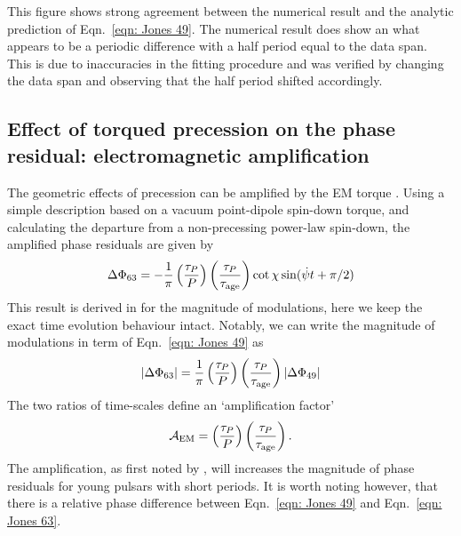 \documentclass[../full_thesis/full_thesis.tex]{subfiles}
\begin{document}
This figure shows strong agreement between the numerical result and the
analytic prediction of Eqn.~\eqref{eqn: Jones 49}. The numerical result does
show an what appears to be a periodic difference with a half period equal to
the data span. This is due to inaccuracies in the fitting procedure and was
verified by changing the data span and observing that the half period shifted
accordingly.


\subsection{Effect of torqued precession on the phase residual: electromagnetic amplification}
\label{sec: phase residual torqued}

The geometric effects of precession can be amplified by the EM torque \citep{Cordes1993}.
Using a simple description based on a vacuum point-dipole spin-down torque,
and calculating the departure from a non-precessing power-law spin-down,
the amplified phase residuals are given by
\begin{align}
\Delta\Phi_{63} = -\frac{1}{\pi}\left(\frac{\tau_{P}}{P}\right)
                               \left(\frac{\tau_{P}}{\tau_{\mathrm{age}}}\right)
                               \cot\chi
                               \sin(\dot{\psi} t + \pi/2)
\label{eqn: Jones 63}
\end{align}
This result is derived in \citet{Jones2001} for the magnitude of modulations, here
we keep the exact time evolution behaviour intact. Notably, we can write the
magnitude of modulations in term of Eqn.~\eqref{eqn: Jones 49} as
\begin{equation}
    |\Delta\Phi_{63}| = \frac{1}{\pi}\left(\frac{\tau_{P}}{P}\right)
    \left(\frac{\tau_{P}}{\tau_{\mathrm{age}}}\right)
                                    |\Delta\Phi_{49}|
\label{eqn: Jones 63 mag}
\end{equation}
The two ratios of time-scales define an `amplification factor'
\begin{equation}
    \mathcal{A}_{\mathrm{EM}} = \left(\frac{\tau_{P}}{P}\right)
                                \left(\frac{\tau_{P}}{\tau_{\mathrm{age}}}\right).
\label{eqn: EM amplification}
\end{equation}
The amplification, as first noted by \citet{Cordes1993}, will increases the
magnitude of phase residuals for young pulsars with short periods. It is worth
noting however, that there is a relative phase difference between
Eqn.~\eqref{eqn: Jones 49} and Eqn.~\ref{eqn: Jones 63}.
\end{document}
